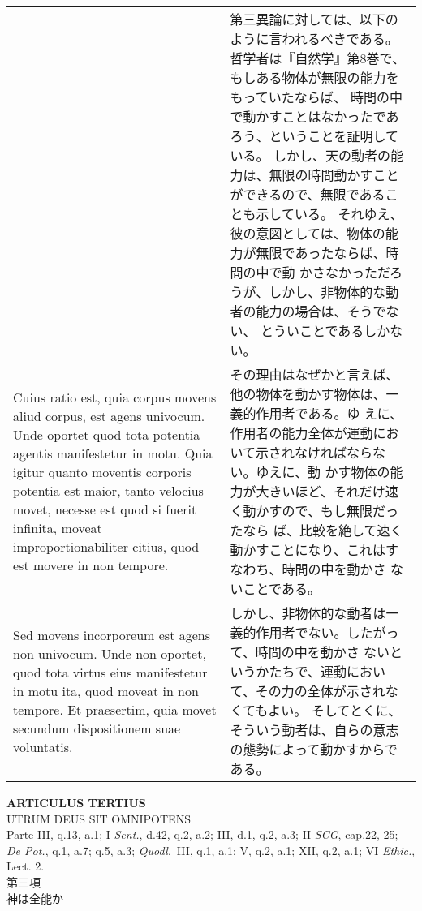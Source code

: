 \documentclass[10pt]{jsarticle} %
\begin{document}
\begin{longtable}{p{21em}p{21em}}
&

第三異論に対しては、以下のように言われるべきである。
哲学者は『自然学』第8巻で、もしある物体が無限の能力をもっていたならば、
 時間の中で動かすことはなかったであろう、ということを証明している。
しかし、天の動者の能力は、無限の時間動かすことができるので、無限であるこ
 とも示している。
それゆえ、彼の意図としては、物体の能力が無限であったならば、時間の中で動
 かさなかっただろうが、しかし、非物体的な動者の能力の場合は、そうでない、
 とういことであるしかない。


\\

Cuius ratio est, quia
 corpus movens aliud corpus, est agens univocum. Unde oportet quod tota
 potentia agentis manifestetur in motu. Quia igitur quanto moventis
 corporis potentia est maior, tanto velocius movet, necesse est quod si
 fuerit infinita, moveat improportionabiliter citius, quod est movere in
 non tempore. 

&

その理由はなぜかと言えば、他の物体を動かす物体は、一義的作用者である。ゆ
 えに、作用者の能力全体が運動において示されなければならない。ゆえに、動
 かす物体の能力が大きいほど、それだけ速く動かすので、もし無限だったなら
 ば、比較を絶して速く動かすことになり、これはすなわち、時間の中を動かさ
 ないことである。

\\


Sed movens incorporeum est agens non univocum. Unde non
 oportet, quod tota virtus eius manifestetur in motu ita, quod moveat in
 non tempore. Et praesertim, quia movet secundum dispositionem suae
 voluntatis.


&

しかし、非物体的な動者は一義的作用者でない。したがって、時間の中を動かさ
 ないというかたちで、運動において、その力の全体が示されなくてもよい。
そしてとくに、そういう動者は、自らの意志の態勢によって動かすからである。





\end{longtable}
\newpage



\begin{center}
 {\Large {\bf ARTICULUS TERTIUS}}\\
 {\large UTRUM DEUS SIT OMNIPOTENS}\\
 {\footnotesize Parte III, q.13, a.1; I {\itshape Sent.}, d.42, q.2,
 a.2; III, d.1, q.2, a.3; II {\itshape SCG}, cap.22, 25; {\itshape De
 Pot.}, q.1, a.7; q.5, a.3; {\itshape Quodl}.~III, q.1, a.1; V, q.2,
 a.1; XII, q.2, a.1; VI {\itshape Ethic.}, Lect. 2.}\\
 {\Large 第三項\\神は全能か}
\end{center}
\end{document}
